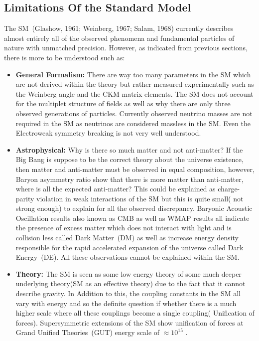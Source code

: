 \subsection{Limitations Of the Standard Model}
The SM~(Glashow, 1961; Weinberg, 1967; Salam, 1968) currently describes almost entirely all of the observed phenomena and fundamental particles of nature with unmatched precision.
However, as indicated from previous sections, there is more to be understood such as:
\begin{itemize}
\item \textbf{General Formalism: } There are way too many parameters in the SM which are not derived within the theory but rather measured experimentally such as the Weinberg angle and the CKM matrix elements. The SM does not account for the multiplet structure of fields as well as why there are only three observed generations of particles. Currently observed neutrino masses are not required in the SM as neutrinos are considered massless in the SM. Even the Electroweak symmetry breaking is not very well understood.
\item \textbf{Astrophysical: }
Why is there so much matter and not anti-matter? If the Big Bang is suppose to be the correct theory about the universe existence, then matter and anti-matter must be observed in equal composition, however, Baryon asymmetry ratio show that there is more matter than anti-matter, where is all the expected anti-matter? This could be explained as charge-parity violation in weak interactions of the SM but this is quite small( not strong enough) to explain for all the observed discrepancy. Baryonic Acoustic Oscillation results also known as CMB as well as WMAP results all indicate the presence of excess matter which does not interact with light and is collision less called Dark Matter~(DM) as well as increase energy density responsible for the rapid accelerated expansion of the universe called Dark Energy~(DE). All these observations cannot be explained within the SM.
\item \textbf{Theory: }
The SM is seen as some low energy theory of some much deeper underlying theory(SM as an effective theory) due to the fact that it cannot describe gravity. In Addition  to this, the coupling constants in the SM all vary with energy and so the definite question if whether there is a much higher scale where all these couplings become a single coupling( Unification of forces). Supersymmetric extensions of the SM show unification of forces at Grand Unified Theories~(GUT) energy scale of $\approx 10^{15}$ \GeV.


\end{itemize}
